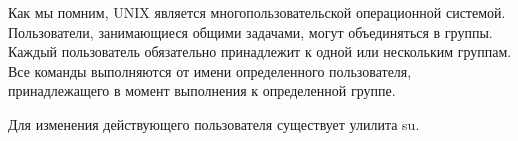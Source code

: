 Как мы помним, UNIX является многопользовательской операционной системой. Пользователи, занимающиеся общими задачами, могут объединяться в группы. Каждый пользователь обязательно принадлежит к одной или нескольким группам. Все команды выполняются от имени определенного пользователя, принадлежащего в момент выполнения к определенной группе.

Для изменения действующего пользователя существует улилита su.